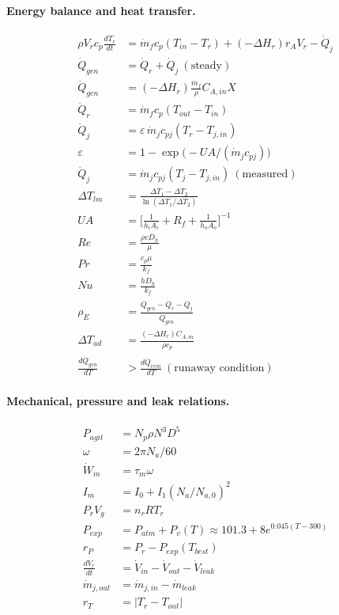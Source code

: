 \documentclass[11pt,a4paper]{article}
\begin{document}
\paragraph{Energy balance and heat transfer.}
\begin{align}
\rho V_r c_p\frac{dT_r}{dt}&=\dot m_f c_p(T_{in}-T_r)+(-\Delta H_r)r_AV_r-\dot Q_j\\ \dot Q_{gen}&=\dot Q_r+\dot Q_j\ (\text{steady})\\ \dot Q_{gen}&=(-\Delta H_r)\frac{\dot m_f}{\rho}C_{A,in}X\\ \dot Q_r&=\dot m_f c_p(T_{out}-T_{in})\\ \dot Q_j&=\varepsilon\,\dot m_jc_{pj}(T_r-T_{j,in})\\ \varepsilon&=1-\exp\!\big(-UA/(\dot m_jc_{pj})\big)\\ \dot Q_j&=\dot m_jc_{pj}(T_j-T_{j,in})\ (\text{measured})\\ \Delta T_{lm}&=\frac{\Delta T_1-\Delta T_2}{\ln(\Delta T_1/\Delta T_2)}\\ UA&=\Big[\tfrac1{h_iA_i}+R_f+\tfrac1{h_oA_o}\Big]^{-1}\\ Re&=\frac{\rho vD_h}{\mu}\\ Pr&=\frac{c_p\mu}{k_f}\\ Nu&=\frac{hD_h}{k_f}\\ \rho_E&=\frac{\dot Q_{gen}-\dot Q_r-\dot Q_j}{\dot Q_{gen}}\\ \Delta T_{ad}&=\frac{(-\Delta H_r)C_{A,in}}{\rho c_p}\\ \frac{d\dot Q_{gen}}{dT}&>\frac{d\dot Q_{rem}}{dT}\ (\text{runaway condition})
\end{align}
\paragraph{Mechanical, pressure and leak relations.}
\begin{align}
P_{agit}&=N_p\rho N^3D^5\\ \omega&=2\pi N_a/60\\ \dot W_m&=\tau_m\omega\\ I_m&=I_0+I_1(N_a/N_{a,0})^2\\ P_rV_g&=n_rRT_r\\ P_{exp}&=P_{atm}+P_v(T)\approx101.3+8e^{0.045(T-300)}\\ r_P&=P_r-P_{exp}(T_{best})\\ \frac{dV_r}{dt}&=\dot V_{in}-\dot V_{out}-\dot V_{leak}\\ \dot m_{j,out}&=\dot m_{j,in}-\dot m_{leak}\\ r_T&=|T_r-T_{out}|
\end{align}
\end{document}
